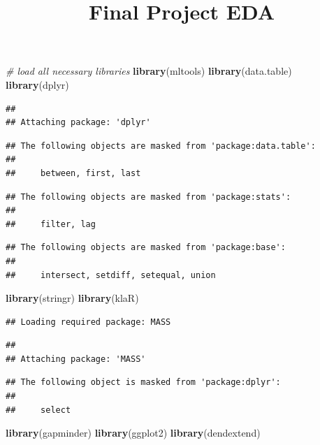 \documentclass[]{article}
\title{Final Project EDA}
\author{}
\date{\vspace{-2.5em}}
\newenvironment{Shaded}{\begin{snugshade}}{\end{snugshade}}
\newcommand{\CommentTok}[1]{\textcolor[rgb]{0.56,0.35,0.01}{\textit{#1}}}
\newcommand{\KeywordTok}[1]{\textcolor[rgb]{0.13,0.29,0.53}{\textbf{#1}}}
\newcommand{\NormalTok}[1]{#1}
\begin{document}
\maketitle

\begin{Shaded}
\begin{Highlighting}[]
\CommentTok{# load all necessary libraries}
\KeywordTok{library}\NormalTok{(mltools)}
\KeywordTok{library}\NormalTok{(data.table)}
\KeywordTok{library}\NormalTok{(dplyr)}
\end{Highlighting}
\end{Shaded}

\begin{verbatim}
## 
## Attaching package: 'dplyr'
\end{verbatim}

\begin{verbatim}
## The following objects are masked from 'package:data.table':
## 
##     between, first, last
\end{verbatim}

\begin{verbatim}
## The following objects are masked from 'package:stats':
## 
##     filter, lag
\end{verbatim}

\begin{verbatim}
## The following objects are masked from 'package:base':
## 
##     intersect, setdiff, setequal, union
\end{verbatim}

\begin{Shaded}
\begin{Highlighting}[]
\KeywordTok{library}\NormalTok{(stringr)}
\KeywordTok{library}\NormalTok{(klaR)}
\end{Highlighting}
\end{Shaded}

\begin{verbatim}
## Loading required package: MASS
\end{verbatim}

\begin{verbatim}
## 
## Attaching package: 'MASS'
\end{verbatim}

\begin{verbatim}
## The following object is masked from 'package:dplyr':
## 
##     select
\end{verbatim}

\begin{Shaded}
\begin{Highlighting}[]
\KeywordTok{library}\NormalTok{(gapminder)}
\KeywordTok{library}\NormalTok{(ggplot2)}
\KeywordTok{library}\NormalTok{(dendextend)}
\end{Highlighting}
\end{Shaded}
\end{document}
